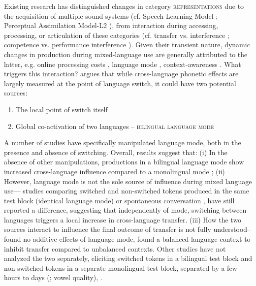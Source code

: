 \documentclass[12 pt]{article}
\begin{document}
Existing research has distinguished changes in category \textsc{representations} due to the acquisition of multiple sound systems (cf. Speech Learning Model \citep{flege1995second,flege2007language}; Perceptual Assimilation Model-L2 \citep{best2007nonnative}), from interaction during accessing, processing, or articulation of these categories (cf. transfer vs. interference \citep{grosjean2012attempt}; competence vs. performance interference \citep{paradis1993linguistic}). 
Given their transient nature, dynamic changes in production during mixed-language use are generally attributed to the latter, e.g. online processing costs \citep[][VOT]{olson2013bilingual,tsui2019impact,vsimavckova2015immediate}, language mode \citep[][vowel quality]{simonet2014phonetic}, context-awareness \citep[][phonological variables]{khattab2013phonetic}. What triggers this interaction? \cite{olson2016role} argues that while cross-language phonetic effects are largely measured at the point of language switch, it could have two potential sources:
\begin{enumerate}
	\item The local point of switch itself
	\item Global co-activation of two languages -- \textsc{bilingual language mode} \citep{grosjean1998studying} 
\end{enumerate}

A number of studies have specifically manipulated language mode, both in the presence and absence of switching. Overall, results suggest that: (i) In the absence of other manipulations, productions in a bilingual language mode show increased cross-language influence compared to a monolingual mode \citep[][vowel quality]{simonet2020increased,simonet2014phonetic}; (ii) However, language mode is not the sole source of influence during mixed language use--- studies comparing switched and non-switched tokens produced in the same test block (identical language mode) \citep[][VOT]{olson2016role,tsui2019impact} or spontaneous conversation \citep[][VOT]{piccinini2015voice}, have still reported a difference, suggesting that independently of mode, switching between languages triggers a local increase in cross-language transfer. (iii) How the two sources interact to influence the final outcome of transfer is not fully understood-- \cite[][VOT]{olson2016role} found no additive effects of language mode, \cite[][VOT]{olson2013bilingual} found a balanced language context to inhibit transfer compared to unbalanced contexts.  Other studies have not analyzed the two separately, eliciting switched tokens in a bilingual test block and non-switched tokens in a separate monolingual test block, separated by a few hours to days (\cite{elias2017effects}; vowel quality), \citep[][VOT]{schwartz2015language, bullock2009trying,antoniou2011inter, vsimavckova2015immediate,vsimavckova2018patterns}.
\end{document}
